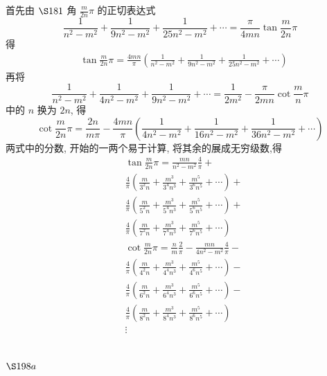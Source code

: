 首先由 $\S 181$ 角 $\frac{m}{2 n} \pi$ 的正切表达式
\[
\frac{1}{n^{2}-m^{2}}+\frac{1}{9 n^{2}-m^{2}}+\frac{1}{25 n^{2}-m^{2}}+\cdots=\frac{\pi}{4 m n} \tan \frac{m}{2 n} \pi
\]
得 
\[
\begin{aligned}
& \tan \frac{m}{2 n} \pi=\frac{4 m n}{\pi}\left(\frac{1}{n^{2}-m^{2}}+\frac{1}{9 n^{2}-m^{2}}+\frac{1}{25 n^{2}-m^{2}}+\cdots\right)
\end{aligned}
\]
再将
\[
\frac{1}{n^{2}-m^{2}}+\frac{1}{4 n^{2}-m^{2}}+\frac{1}{9 n^{2}-m^{2}}+\cdots=\frac{1}{2 m^{2}}-\frac{\pi}{2 m n} \cot \frac{m}{n} \pi
\]
中的 $n$ 换为 $2 n$, 得
\[
\cot \frac{m}{2 n} \pi=\frac{2 n}{m \pi}-\frac{4 m n}{\pi}\left(\frac{1}{4 n^{2}-m^{2}}+\frac{1}{16 n^{2}-m^{2}}+\frac{1}{36 n^{2}-m^{2}}+\cdots\right)
\]
两式中的分数, 开始的一两个易于计算, 将其余的展成无穷级数,得
\[
\begin{aligned}
& \tan \frac{m}{2 n} \pi= \frac{m n}{n^{2}-m^{2}} \frac{4}{\pi}+ \\
& \frac{4}{\pi}\left(\frac{m}{3^{2} n}+\frac{m^{3}}{3^{4} n^{3}}+\frac{m^{5}}{3^{6} n^{5}}+\cdots\right)+ \\
& \frac{4}{\pi}\left(\frac{m}{5^{2} n}+\frac{m^{3}}{5^{4} n^{3}}+\frac{m^{5}}{5^{6} n^{5}}+\cdots\right)+ \\
& \frac{4}{\pi}\left(\frac{m}{7^{2} n}+\frac{m^{3}}{7^{4} n^{3}}+\frac{m^{5}}{7^{6} n^{5}}+\cdots\right) \\
& \cot \frac{m}{2 n} \pi= \frac{n}{m} \frac{2}{\pi}-\frac{m n}{4 n^{2}-m^{2}} \frac{4}{\pi}- \\
& \frac{4}{\pi}\left(\frac{m}{4^{2} n}+\frac{m^{3}}{4^{4} n^{3}}+\frac{m^{5}}{4^{6} n^{5}}+\cdots\right)- \\
& \frac{4}{\pi}\left(\frac{m}{6^{2} n}+\frac{m^{3}}{6^{4} n^{3}}+\frac{m^{5}}{6^{6} n^{5}}+\cdots\right)- \\
& \frac{4}{\pi}\left(\frac{m}{8^{2} n}+\frac{m^{3}}{8^{4} n^{3}}+\frac{m^{5}}{8^{6} n^{5}}+\cdots\right) \\
& \vdots
\end{aligned}
\]
\section{$\S 198a$}

